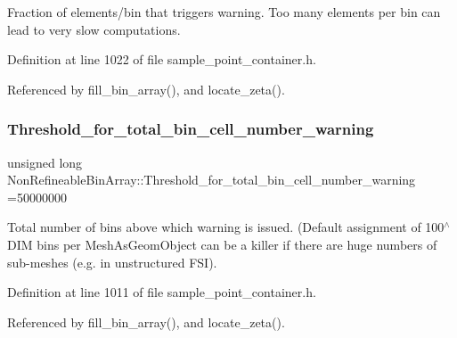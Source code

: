Fraction of elements/bin that triggers warning. Too many elements per bin can lead to very slow computations. 



Definition at line 1022 of file sample\+\_\+point\+\_\+container.\+h.



Referenced by fill\+\_\+bin\+\_\+array(), and locate\+\_\+zeta().

\mbox{\label{classNonRefineableBinArray_adb9e92176f8fc319f5dcf82656ae57ee}} 
\subsubsection{\texorpdfstring{Threshold\+\_\+for\+\_\+total\+\_\+bin\+\_\+cell\+\_\+number\+\_\+warning}{Threshold\_for\_total\_bin\_cell\_number\_warning}}
{\footnotesize\ttfamily unsigned long Non\+Refineable\+Bin\+Array\+::\+Threshold\+\_\+for\+\_\+total\+\_\+bin\+\_\+cell\+\_\+number\+\_\+warning =50000000\hspace{0.3cm}{\ttfamily [static]}}



Total number of bins above which warning is issued. (Default assignment of 100$^\wedge$\+D\+IM bins per Mesh\+As\+Geom\+Object can be a killer if there are huge numbers of sub-\/meshes (e.\+g. in unstructured F\+SI). 



Definition at line 1011 of file sample\+\_\+point\+\_\+container.\+h.



Referenced by fill\+\_\+bin\+\_\+array(), and locate\+\_\+zeta().

\mbox{\label{classNonRefineableBinArray_a1c6ff21c3d267b12fbfed4dbcaf7b55f}} 
